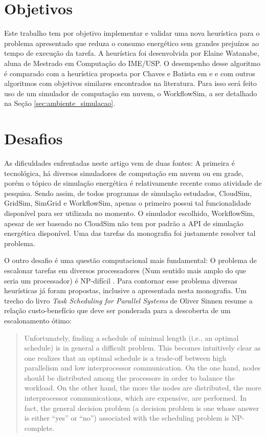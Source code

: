\section{Objetivos}
\label{sec:objetivos}
Este trabalho tem por objetivo implementar e validar uma nova heurística para o
problema apresentado que reduza o consumo energético sem grandes prejuízos
ao tempo de execução da tarefa. A heurística foi desenvolvida por Elaine Watanabe, 
aluna de Mestrado em Computação do IME/USP. O desempenho desse algoritmo é
comparado com a heurística proposta por Chaves e Batista em
\cite{chaves:scheduling_software_requirements} e
\cite{batista:embedding_software_requirements} e com outros algoritmos com
objetivos similares encontrados na literatura. Para isso será feito uso de um
simulador de computação em nuvem, o WorkflowSim, a ser detalhado na Seção
\ref{sec:ambiente_simulacao}.


\section{Desafios}
\label{sec:desafios}
As dificuldades enfrentadas neste artigo vem de duas fontes: A primeira é
tecnológica, há diversos simuladores de computação em nuvem ou em grade, porém
o tópico de simulação energética é relativamente recente como atividade de 
pesquisa. Sendo assim, de todos programas de simulação estudados, CloudSim, 
GridSim, SimGrid e WorkflowSim, apenas o primeiro possui tal funcionalidade
disponível para ser utilizada no momento. O simulador escolhido, WorkflowSim,
apesar de ser baseado no CloudSim  não tem por padrão a API de simulação energética
disponível. Uma das tarefas da monografia foi justamente resolver tal problema.

O outro desafio é uma questão computacional mais fundamental: O problema de 
escalonar tarefas em diversos processadores (Num sentido mais amplo do que seria
um processador) é NP-difícil \cite{sinnen:task_scheduling_parallel_systems}.
Para contornar esse problema diversas heurísticas já foram propostas, inclusive
a apresentada nesta monografia. Um trecho do livro
\emph{Task Scheduling for Parallel Systems} de Oliver Sinnen resume a relação
custo-benefício que deve ser ponderada para a descoberta de um escalonamento
ótimo:

\begin{quote}
Unfortunately, finding a schedule of minimal length (i.e., an optimal schedule)
is in general a difficult problem. This becomes intuitively clear as one realizes that
an optimal schedule is a trade-off between high parallelism and low interprocessor
communication. On the one hand, nodes should be distributed among the processors
in order to balance the workload. On the other hand, the more the nodes are distributed,
the more interprocessor communications, which are expensive, are performed. In fact,
the general decision problem (a decision problem is one whose answer is either ``yes''
or ``no'') associated with the scheduling problem is NP-complete. 
\cite{sinnen:task_scheduling_parallel_systems}
\end{quote}



